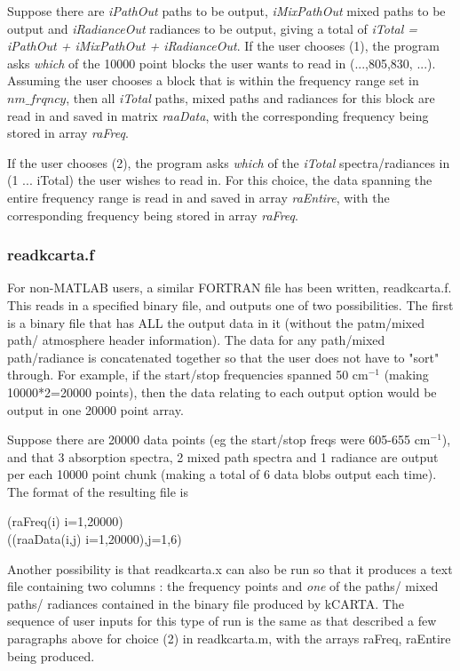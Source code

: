 \documentclass[12pt]{article}
\newcommand{\kc}{\textsf{kCARTA}\xspace}
\newcommand{\cm}{\hbox{cm}}
\newcommand{\ttab}{\indent\indent}
\begin{document}
{{{{Suppose there are {\em iPathOut} paths to be output, {\em iMixPathOut} mixed 
paths to be output and {\em iRadianceOut} radiances to be output, giving a 
total of {\em iTotal = iPathOut + iMixPathOut + iRadianceOut}. If the user 
chooses (1), the program asks {\em which} of the 10000 point blocks the user 
wants to read in (...,805,830, ...). Assuming the user chooses a block that is
within the frequency range set in $nm\_frqncy$, then all {\em iTotal} paths, 
mixed paths and radiances for this block are read in and saved in matrix
{\em raaData}, with the corresponding  frequency being stored in
array {\em raFreq}.

If the user chooses (2), the program asks {\em which} of the {\em iTotal} 
spectra/radiances in (1 ... iTotal) the user wishes to read in.  
For this choice, the data spanning the entire frequency range is read in 
and saved in array {\em raEntire},  with the corresponding frequency being 
stored in array {\em raFreq}.

\subsubsection{readkcarta.f}

For non-{\sf MATLAB} users, a similar {\sf FORTRAN} file has been written,
readkcarta.f.  This reads in a specified binary file, and outputs one of two
possibilities. The first is a binary file that has ALL the output data in it 
(without the patm/mixed path/ atmosphere header information).
The data for any path/mixed path/radiance is concatenated together
so that the user does not have to "sort" through.  For example, if
the start/stop frequencies spanned 50 \cm$^{-1}$ (making
10000*2=20000 points), then the data relating to each output option
would be output in one 20000 point array.

Suppose there are 20000 data points (eg the start/stop freqs were
605-655 \cm$^{-1}$), and that 3 absorption spectra, 2 mixed path
spectra and 1 radiance are output per each 10000 point chunk
(making a total of 6 data blobs output each time).  The format of
the resulting file is

\smallskip
\ttab (raFreq(i) i=1,20000) \\
\ttab ((raaData(i,j) i=1,20000),j=1,6)

\smallskip
Another possibility is that {\sf readkcarta.x} can also be run so that 
it produces a text file containing two columns : the frequency points 
and {\em one} of the paths/ mixed paths/ radiances contained in the binary 
file produced by \kc. The sequence of user inputs for this type of run is the 
same as that described a few paragraphs above for choice (2) in 
{\sf readkcarta.m}, with the arrays raFreq, raEntire being produced.

}}}}
\end{document}
